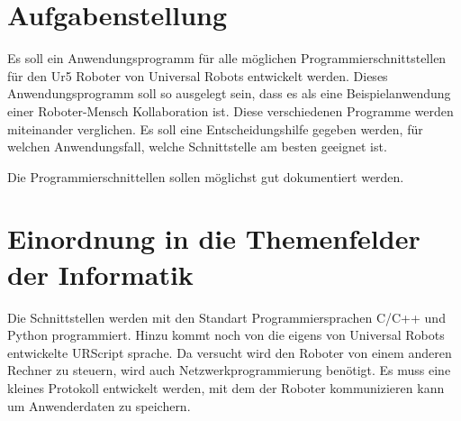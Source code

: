 \section{Aufgabenstellung}
\label{aufgabenstellung}

Es soll ein Anwendungsprogramm für alle möglichen Programmierschnittstellen für den Ur5 Roboter von Universal Robots entwickelt werden.
Dieses Anwendungsprogramm soll so ausgelegt sein, dass es als eine Beispielanwendung einer Roboter-Mensch Kollaboration ist.
Diese verschiedenen Programme werden miteinander verglichen. Es soll eine Entscheidungshilfe gegeben werden, für welchen Anwendungsfall, welche Schnittstelle am besten geeignet ist.

Die Programmierschnittellen sollen möglichst gut dokumentiert werden.  

\section{Einordnung in die Themenfelder der Informatik}
\label{sec:einordnung}

Die Schnittstellen werden mit den Standart Programmiersprachen C/C++ und Python programmiert. Hinzu kommt noch von die eigens von Universal Robots entwickelte URScript sprache.
Da versucht wird den Roboter von einem anderen Rechner zu steuern, wird auch Netzwerkprogrammierung benötigt. Es muss eine kleines Protokoll entwickelt werden, mit dem der Roboter kommunizieren kann um Anwenderdaten zu speichern. 
